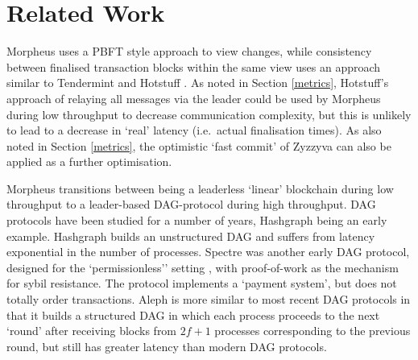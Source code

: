 \section{Related Work}
\label{rw} 

 Morpheus uses a PBFT \cite{castro1999practical} style approach to view changes, while consistency between finalised transaction blocks within the same view uses an approach similar to Tendermint \cite{buchman2016tendermint,buchman2018latest} and Hotstuff \cite{yin2019hotstuff}. As noted in Section \ref{metrics}, Hotstuff's approach of relaying all messages via the leader could be used by Morpheus during low throughput to decrease communication complexity, but this is unlikely to lead to a decrease in `real' latency (i.e.\ actual finalisation times). As also noted in Section \ref{metrics}, the optimistic `fast commit' of Zyzzyva \cite{gueta2019sbft,kotla2007zyzzyva} can also be applied as a further optimisation. 

 \vspace{0.2cm} 
 Morpheus transitions between being a leaderless `linear' blockchain during low throughput to a leader-based DAG-protocol during high throughput. DAG protocols have been studied for a number of years, Hashgraph \cite{baird2016swirlds} being an early example. Hashgraph builds an unstructured DAG and suffers from latency exponential in the number of processes. Spectre was another early DAG protocol, designed for the `permissionless'' setting \cite{sompolinsky2016spectre}, with proof-of-work as the mechanism for sybil resistance. The protocol implements a `payment system', but does not totally order transactions.  Aleph \cite{gkagol2019aleph} is more similar to most recent DAG protocols in that it builds a structured DAG in which each process proceeds to the next `round' after receiving blocks from $2f+1$ processes corresponding to the previous round, but still has greater  latency than modern DAG protocols.  

